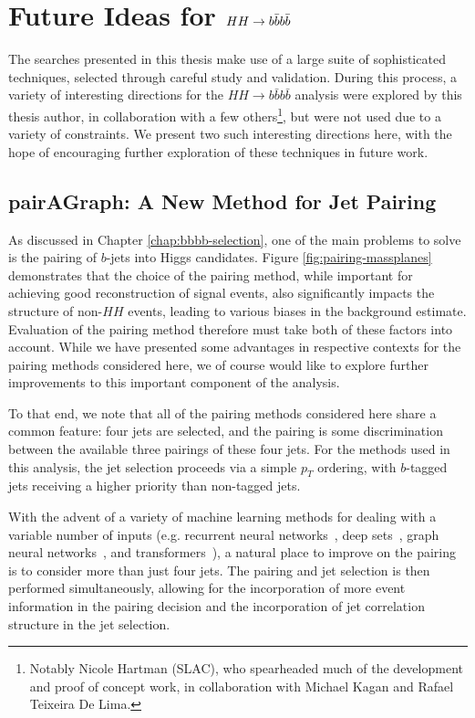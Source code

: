 \chapter{Future Ideas for $HH\rightarrow b\bar{b}b\bar{b}$}
\label{app:future}

The searches presented in this thesis make use of a large suite of sophisticated techniques, selected 
through careful study and validation. During this process, a variety of interesting 
directions for the $HH\rightarrow b\bar{b}b\bar{b}$ analysis were explored by this thesis author, 
in collaboration with a few others\footnote{Notably Nicole Hartman (SLAC), who spearheaded much of the 
development and proof of concept work, in collaboration with Michael Kagan and Rafael Teixeira De Lima.}, 
but were not used due to a variety of constraints. We present two such interesting directions here, 
with the hope of encouraging further exploration of these techniques in future work.

\section{pairAGraph: A New Method for Jet Pairing}
As discussed in Chapter \ref{chap:bbbb-selection}, one of the main problems to solve is the pairing of 
$b$-jets into Higgs candidates. Figure \ref{fig:pairing-massplanes} demonstrates that the choice 
of the pairing method, while important for achieving good reconstruction of signal events, also 
significantly impacts the structure of non-$HH$ events, leading to various biases in the 
background estimate. Evaluation of the pairing method therefore must take both of these factors 
into account. While we have presented some advantages in respective contexts for the pairing 
methods considered here, we of course would like to explore further improvements to this important 
component of the analysis.

To that end, we note that all of the pairing methods considered here share a common feature: 
four jets are selected, and the pairing is some discrimination between the available three pairings 
of these four jets. For the methods used in this analysis, the jet selection proceeds via a 
simple $p_{T}$ ordering, with $b$-tagged jets receiving a higher priority than non-tagged jets.

With the advent of a variety of machine learning methods for dealing with a variable number of 
inputs (e.g. recurrent neural networks~\cite{RNNs}, deep sets~\cite{DeepSets}, graph neural networks~\cite{GNNs}, 
and transformers~\cite{Transformers}), a natural place to improve on the 
pairing is to consider more than just four jets. The pairing and jet selection is then performed 
simultaneously, allowing for the incorporation of more event information in the pairing decision and 
the incorporation of jet correlation structure in the jet selection.

